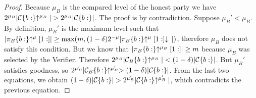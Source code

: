 \begin{proof}
    Because $\mu_B$ is the compared level of the honest party we have
    $2^{\mu_B}|\mathcal{C}\{b:\}\negthickspace\uparrow^{\mu_B}| > 2^{\mu_B}|\mathcal{C}\{b:\}|$.
    The proof is by contradiction. Suppose $\mu_B' < \mu_B$.
    By definition, $\mu_B'$ is the maximum level such that
    $|\pi_B\{b:\}\negthickspace\uparrow^\mu[1:]| \geq \max(m, (1 -
    \delta)2^{-\mu}|\pi_B\{b:\}\negthickspace\uparrow^\mu[1:]\negthickspace\downarrow\,|)$, therefore
    $\mu_B$ does not satisfy this condition. But we know that
    $|\pi_B\{b:\}\negthickspace\uparrow^{\mu_B}[1:]| \geq m$ because $\mu_B$ was selected by
    the Verifier. Therefore
    $2^{\mu_B}|\mathcal{C}_B\{b:\}\negthickspace\uparrow^{\mu_B}| < (1 - \delta)|\mathcal{C}\{b:\}|$.
    But $\mu_B'$ satisfies goodness, so
    $2^{\mu_B'}|\mathcal{C}_B\{b:\}\negthickspace\uparrow^{\mu_B'} > (1 - \delta)|\mathcal{C}\{b:\}|$.
    From the last two equations, we obtain
    $(1 - \delta)|\mathcal{C}\{b:\}| > 2^{\mu_B'}|\mathcal{C}\{b:\}\negthickspace\uparrow^{\mu_B'}|$,
    which contradicts the previous equation.
    \Qed
\end{proof}
